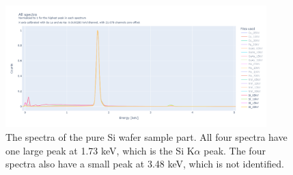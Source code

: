 \begin{figure}
    \centering
    \includegraphics[width=0.90\textwidth]{figures/Spectra_Si.png}
    \caption{
        The spectra of the pure Si wafer sample part.
        All four spectra have one large peak at 1.73 keV, which is the Si K$\alpha$ peak.
        The four spectra also have a small peak at 3.48 keV, which is not identified. %
    }
    \label{fig:results:Spectra_Si}
\end{figure}